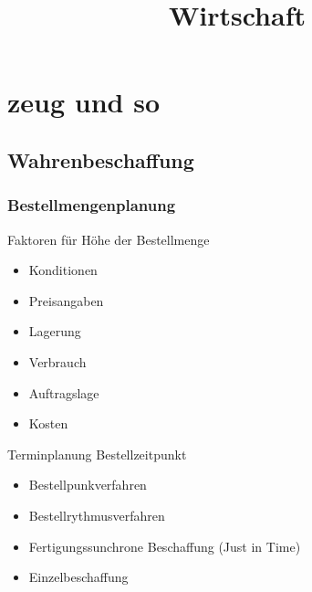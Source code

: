 \documentclass{scrartcl}
\title{Wirtschaft}
\begin{document}
\maketitle

\tableofcontents

\section{zeug und so}
\subsection{Wahrenbeschaffung}
\subsubsection{Bestellmengenplanung}

Faktoren für Höhe der Bestellmenge

\begin{itemize}
	\item
		Konditionen
	\item
		Preisangaben
	\item
		Lagerung
	\item
		Verbrauch
	\item
		Auftragslage
	\item
		Kosten
\end{itemize}

Terminplanung Bestellzeitpunkt

\begin{itemize}
	\item
		Bestellpunkverfahren
	\item
		Bestellrythmusverfahren
	\item
		Fertigungssunchrone Beschaffung (Just in Time)
	\item
		Einzelbeschaffung
\end{itemize}
\end{document}
